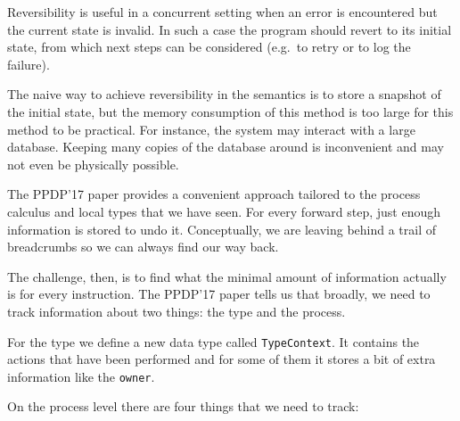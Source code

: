 \documentclass[runningheads,plain]{llncs}
\begin{document}
Reversibility is useful in a concurrent setting when an error is
encountered but the current state is invalid. In such a case the program
should revert to its initial state, from which next steps can be
considered (e.g.~to retry or to log the failure).

The naive way to achieve reversibility in the semantics is to store a
snapshot of the initial state, but the memory consumption of this method
is too large for this method to be practical. For instance, the system
may interact with a large database. Keeping many copies of the database
around is inconvenient and may not even be physically possible.

The PPDP'17 paper provides a convenient approach tailored to the process
calculus and local types that we have seen. For every forward step, just
enough information is stored to undo it. Conceptually, we are leaving
behind a trail of breadcrumbs so we can always find our way back.

The challenge, then, is to find what the minimal amount of information
actually is for every instruction. The PPDP'17 paper tells us that
broadly, we need to track information about two things: the type and the
process.

For the type we define a new data type called \texttt{TypeContext}. It
contains the actions that have been performed and for some of them it
stores a bit of extra information like the \texttt{owner}.

On the process level there are four things that we need to track:
\end{document}
